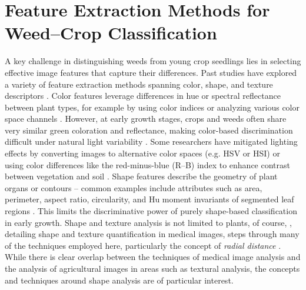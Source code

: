 \documentclass[letterpaper]{report}
\begin{document}
\section{Feature Extraction Methods for Weed–Crop Classification}

A key challenge in distinguishing weeds from young crop seedlings lies in selecting effective image features that capture their differences. Past studies have explored a variety of feature extraction methods spanning color, shape, and texture descriptors \parencite{Garibaldi-Marquez2022-yn}. Color features leverage differences in hue or spectral reflectance between plant types, for example by using color indices or analyzing various color space channels \parencite{Wu2021-gt}. However, at early growth stages, crops and weeds often share very similar green coloration and reflectance, making color-based discrimination difficult under natural light variability \parencite{Garibaldi-Marquez2022-yn}. Some researchers have mitigated lighting effects by converting images to alternative color spaces (e.g. HSV or HSI) or using color differences like the red-minus-blue (R–B) index to enhance contrast between vegetation and soil \parencite{Wu2021-gt}. Shape features describe the geometry of plant organs or contours – common examples include attributes such as area, perimeter, aspect ratio, circularity, and Hu moment invariants of segmented leaf regions \parencite{Garibaldi-Marquez2022-yn}. This limits the discriminative power of purely shape-based classification in early growth. Shape and texture analysis is not limited to plants, of course, \citeauthor{Bankman2009-wq}, detailing shape and texture quantification in medical images, steps through many of the techniques employed here, particularly the concept of \textit{radial distance} \parencite{Bankman2009-wq}. While there is clear overlap between the techniques of medical image analysis and the analysis of agricultural images in areas such as textural analysis, the concepts and techniques around shape analysis are of particular interest.
\end{document}
